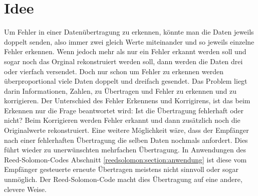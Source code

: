 %
%
\section{Idee
\label{reedsolomon:section:idee}}
Um Fehler in einer Datenübertragung zu erkennen, könnte man die Daten jeweils doppelt senden,
    also immer zwei gleich Werte miteinander und so jeweils einzelne Fehler erkennen.
Wenn jedoch mehr als nur ein Fehler erkannt werden soll und sogar noch das Orginal rekonstruiert werden soll,
dann werden die Daten drei oder vierfach versendet.
Doch nur schon um Fehler zu erkennen werden überproportional viele Daten doppelt und dreifach gesendet.
Das Problem liegt darin Informationen, Zahlen, 
    zu Übertragen und Fehler zu erkennen und zu korrigieren.
Der Unterschied des Fehler Erkennens und Korrigirens, ist das beim Erkennen nur die Frage beantwortet wird: Ist die Übertragung fehlerhaft oder nicht?
Beim Korrigieren werden Fehler erkannt und dann zusätzlich noch die Originalwerte rekonstruiert.
Eine weitere Möglichkeit wäre, dass der Empfänger nach einer fehlerhaften Übertragung die selben Daten nochmals anfordert.
Dies führt wieder zu unerwünschten mehrfachen Übertragung.
In Anwendungen des Reed-Solomon-Codes Abschnitt  \ref{reedsolomon:section:anwendung}
    ist diese vom Empfänger gesteuerte erneute Übertragen meistens nicht sinnvoll oder sogar unmöglich.
Der Reed-Solomon-Code macht dies Übertragung auf eine andere, clevere Weise.

